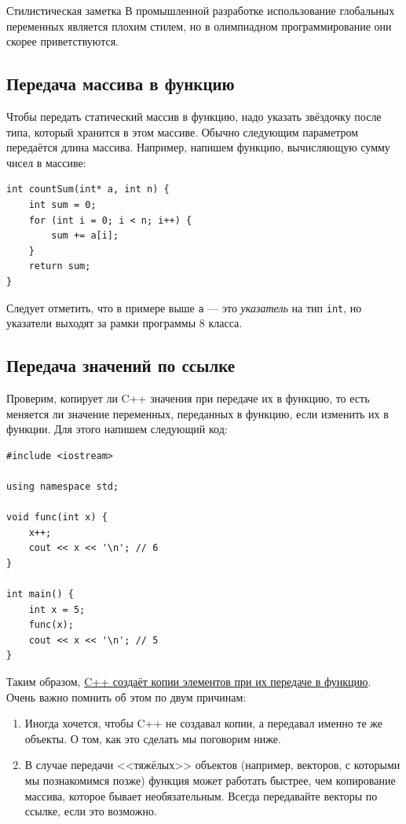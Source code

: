 \documentclass{article}
\newcommand{\style}[1]{
	\begin{sectionenv}[green!30!white]{Стилистическая заметка}
		#1
	\end{sectionenv}
}
\begin{document}
	\style{В промышленной разработке использование глобальных переменных является плохим стилем, но в олимпиадном программирование они скорее приветствуются.}
		
	\subsection{Передача массива в функцию}
	
	Чтобы передать статический массив в функцию, надо указать звёздочку после типа, который хранится в этом массиве. Обычно следующим параметром передаётся длина массива. Например, напишем функцию, вычисляющую сумму чисел в массиве:
	
	\begin{lstlisting}
int countSum(int* a, int n) {
	int sum = 0;
	for (int i = 0; i < n; i++) {
		sum += a[i];	
	}
	return sum;
}
	\end{lstlisting}
	
	Следует отметить, что в примере выше \texttt{a} --- это \textit{указатель} на тип \texttt{int}, но указатели выходят за рамки программы 8 класса.
	
	\subsection{Передача значений по ссылке}
	
	Проверим, копирует ли C++ значения при передаче их в функцию, то есть меняется ли значение переменных, переданных в функцию, если изменить их в функции. Для этого напишем следующий код:
	
	\begin{lstlisting}
#include <iostream>

using namespace std;

void func(int x) {
	x++;
	cout << x << '\n'; // 6
}

int main() {
	int x = 5;
	func(x);
	cout << x << '\n'; // 5
}
	\end{lstlisting}
	
	Таким образом, \underline{C++ создаёт копии элементов при их передаче в функцию}. Очень важно помнить об этом по двум причинам:
	
	\begin{enumerate}
		\item{Иногда хочется, чтобы C++ не создавал копии, а передавал именно те же объекты. О том, как это сделать мы поговорим ниже.}
		\item{В случае передачи <<тяжёлых>> объектов (например, векторов, с которыми мы познакомимся позже) функция может работать быстрее, чем копирование массива, которое бывает необязательным. Всегда передавайте векторы по ссылке, если это возможно.}
	\end{enumerate}
	
\end{document}
